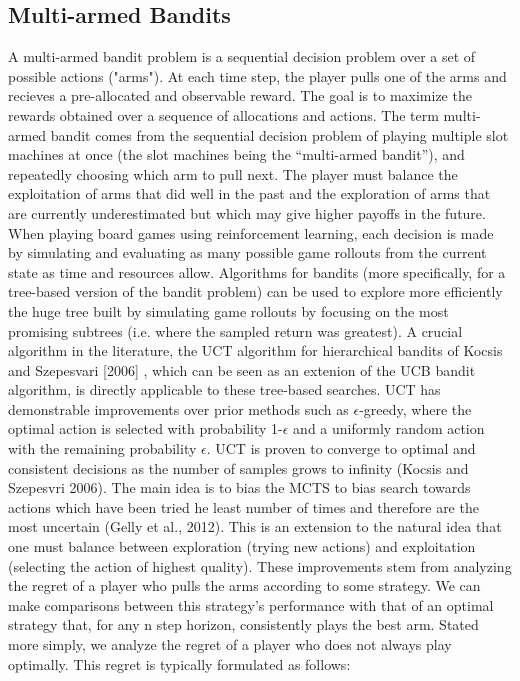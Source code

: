 \documentclass[a4paper,12pt]{proposal}
\begin{document}
\subsection{Multi-armed Bandits}
A multi-armed bandit problem \cite{robbins1952} is a sequential decision problem over a set of possible actions ("arms"). At each time step, the player pulls one of the arms and recieves a pre-allocated and observable reward. The goal is to maximize the rewards obtained over a sequence of allocations and actions. The term multi-armed bandit comes from the sequential decision problem of playing multiple slot machines at once (the slot machines being the “multi-armed bandit”), and repeatedly choosing which arm to pull next. The player must balance the exploitation of arms that did well in the past and the exploration of arms that are currently underestimated but which may give higher payoffs in the future. 
When playing board games using reinforcement learning, each decision is made by simulating and evaluating as many possible game rollouts from the current state as time and resources allow. Algorithms for bandits (more specifically, for a tree-based version of the bandit problem) can be used to explore more efficiently the huge tree built by simulating game rollouts by focusing on the most promising subtrees (i.e. where the sampled return was greatest). A crucial algorithm in the literature, the UCT algorithm for hierarchical bandits of Kocsis and Szepesvari [2006] \cite{Kocsis2006}, which can be seen as an extenion of the UCB bandit algorithm, is directly applicable to these tree-based searches. UCT has demonstrable improvements over prior methods such as \(\epsilon\)-greedy, where the optimal action is selected with probability 1-\(\epsilon\) and a uniformly random action with the remaining probability \(\epsilon\). UCT is proven to converge to optimal and consistent decisions as the number of samples grows to infinity (Kocsis and Szepesvri 2006). The main idea is to bias the MCTS to bias search towards actions which have been tried he least number of times and therefore are the most uncertain (Gelly et al., 2012). This is an extension to the natural idea that one must balance between exploration (trying new actions) and exploitation (selecting the action of highest quality). These improvements stem from analyzing the regret of a player who pulls the arms according to some strategy. We can make comparisons between this strategy's performance with that of an optimal strategy that, for any n step horizon, consistently plays the best arm. Stated more simply, we analyze the regret of a player who does not always play optimally. This regret is typically formulated as follows:
\end{document}
